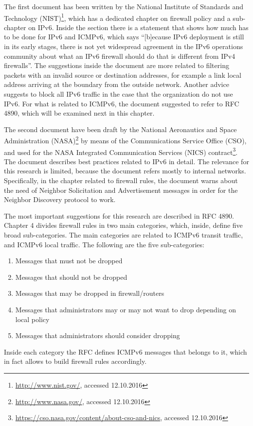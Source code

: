 \documentclass[12pt]{article}
\begin{document}
The first document has been written by the National Institute of Standards and Technology (NIST)\footnote{\url{http://www.nist.gov/}, accessed 12.10.2016}, which has a dedicated chapter on firewall policy and a sub-chapter on IPv6. Inside the section there is a statement that shows how much has to be done for IPv6 and ICMPv6, which says ``[b]ecause IPv6 deployment is still in its early stages, there is not yet widespread agreement in the IPv6 operations community about what an IPv6 firewall should do that is different from IPv4 firewalls''. The suggestions inside the document are more related to filtering packets with an invalid source or destination addresses, for example a link local address arriving at the boundary from the outside network. Another advice suggests to block all IPv6 traffic in the case that the organization do not use IPv6. For what is related to ICMPv6, the document suggested to refer to RFC 4890, which will be examined next in this chapter.\cite{nist}

The second document have been draft by the National Aeronautics and Space Administration (NASA)\footnote{\url{http://www.nasa.gov/}, accessed 12.10.2016} by means of the Communications Service Office (CSO), and used for the NASA Integrated Communication Services (NICS) contract\footnote{\url{https://cso.nasa.gov/content/about-cso-and-nics}, accessed 12.10.2016}. The document describes best practices related to IPv6 in detail. The relevance for this research is limited, because the document refers mostly to internal networks. Specifically, in the chapter related to firewall rules, the document warns about the need of Neighbor Solicitation and Advertisement messages in order for the Neighbor Discovery protocol to work\cite{nics}.

The most important suggestions for this research are described in RFC 4890. Chapter 4 divides firewall rules in two main categories, which, inside, define five broad sub-categories. The main categories are related to ICMPv6 transit traffic, and ICMPv6 local traffic. The following are the five sub-categories:

\vspace{-5pt}
\begin{enumerate}[noitemsep,topsep=0pt,partopsep=0pt]
 \item Messages that must not be dropped
 \item Messages that should not be dropped
 \item Messages that may be dropped in firewall/routers
 \item Messages that administrators may or may not want to drop depending on local policy
 \item Messages that administrators should consider dropping
\end{enumerate}
Inside each category the RFC defines ICMPv6 messages that belongs to it, which in fact allows to build firewall rules accordingly\cite{rfc4890}.
\end{document}
